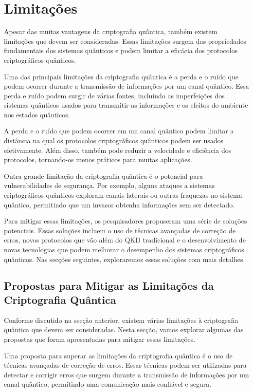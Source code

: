 \chapter{Limitações}

Apesar das muitas vantagens da criptografia quântica, também existem limitações que devem ser consideradas. Essas limitações surgem das propriedades fundamentais dos sistemas quânticos e podem limitar a eficácia dos protocolos criptográficos quânticos.

Uma das principais limitações da criptografia quântica é a perda e o ruído que podem ocorrer durante a transmissão de informações por um canal quântico. Essa perda e ruído podem surgir de várias fontes, incluindo as imperfeições dos sistemas quânticos usados para transmitir as informações e os efeitos do ambiente nos estados quânticos.

A perda e o ruído que podem ocorrer em um canal quântico podem limitar a distância na qual os protocolos criptográficos quânticos podem ser usados efetivamente. Além disso, também pode reduzir a velocidade e eficiência dos protocolos, tornando-os menos práticos para muitas aplicações.

Outra grande limitação da criptografia quântica é o potencial para vulnerabilidades de segurança. Por exemplo, alguns ataques a sistemas criptográficos quânticos exploram canais laterais ou outras fraquezas no sistema quântico, permitindo que um invasor obtenha informações sem ser detectado.

Para mitigar essas limitações, os pesquisadores propuseram uma série de soluções potenciais. Essas soluções incluem o uso de técnicas avançadas de correção de erros, novos protocolos que vão além do QKD tradicional e o desenvolvimento de novas tecnologias que podem melhorar o desempenho dos sistemas criptográficos quânticos. Nas secções seguintes, exploraremos essas soluções com mais detalhes.

\section{Propostas para Mitigar as Limitações da Criptografia Quântica}

Conforme discutido na secção anterior, existem várias limitações à criptografia quântica que devem ser consideradas. Nesta secção, vamos explorar algumas das propostas que foram apresentadas para mitigar essas limitações.

Uma proposta para superar as limitações da criptografia quântica é o uso de técnicas avançadas de correção de erros. Essas técnicas podem ser utilizadas para detectar e corrigir erros que surgem durante a transmissão de informações por um canal quântico, permitindo uma comunicação mais confiável e segura.

